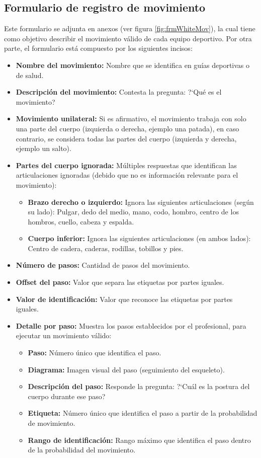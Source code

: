 \subsection{Formulario de registro de movimiento} \label{ins:frmMov}
Este formulario se adjunta en anexos (ver figura \ref{fig:frmWhiteMov}), la cual tiene como objetivo describir el movimiento v\'alido de cada equipo deportivo. Por otra parte, el formulario est\'a compuesto por los siguientes incisos:
\begin{itemize}
	\item \textbf{Nombre del movimiento:} Nombre que se identifica en gu\'ias deportivas o de salud.
	\item \textbf{Descripci\'on del movimiento: } Contesta la pregunta: ?`Qu\'e es el movimiento?
	\item \textbf{Movimiento unilateral:} Si es afirmativo, el movimiento trabaja con solo una parte del cuerpo (izquierda o derecha, ejemplo una patada), en caso contrario, se considera todas las partes del cuerpo (izquierda y derecha, ejemplo un salto).
	\item \textbf{Partes del cuerpo ignorada:} M\'ultiples respuestas que identifican las articulaciones ignoradas (debido que no es informaci\'on relevante para el movimiento):
	\begin{itemize}
		\item \textbf{Brazo derecho o izquierdo:} Ignora las siguientes articulaciones (seg\'un su lado): Pulgar, dedo del medio, mano, codo, hombro, centro de los hombros, cuello, cabeza y espalda.
		\item \textbf{Cuerpo inferior:} Ignora las siguientes articulaciones (en ambos lados): Centro de cadera, caderas, rodillas, tobillos y pies.
	\end{itemize}
		\item \textbf{N\'umero de pasos:} Cantidad de pasos del movimiento.
		\item \textbf{Offset del paso:} Valor que separa las etiquetas por partes iguales.
		\item \textbf{Valor de identificaci\'on:} Valor que reconoce las etiquetas por partes iguales.
		\item \textbf{Detalle por paso:} Muestra los pasos establecidos por el profesional, para ejecutar un movimiento v\'alido:
			\begin{itemize}
		\item \textbf{Paso:} N\'umero \'unico que identifica el paso.
		\item \textbf{Diagrama:} Imagen visual del paso (seguimiento del esqueleto).
		\item \textbf{Descripci\'on del paso:} Responde la pregunta: ?`Cu\'al es la postura del cuerpo durante ese paso?
		\item \textbf{Etiqueta:} N\'umero \'unico que identifica el paso a partir de la probabilidad de movimiento.
	\item \textbf{Rango de identificaci\'on:} Rango m\'aximo que identifica el paso dentro de la probabilidad del movimiento.
	\end{itemize}
\end{itemize}
